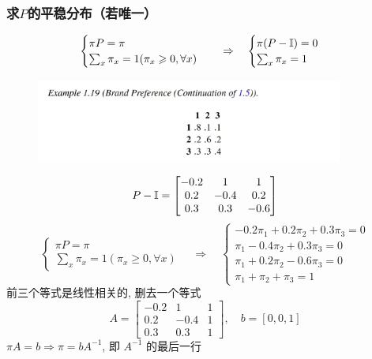 \subsubsection{求$P$的平稳分布（若唯一）}
\[
\begin{cases}
    \pi P=\pi\\
    \sum_{x}\pi_x=1(\pi_x\geqslant 0,\forall x)
\end{cases}\quad \Rightarrow \quad
\begin{cases}
    \pi(P-\mathbb I)=0\\
    \sum_x\pi_x=1
\end{cases}
\]
\begin{example}[Durrett, 1.19]
    \begin{figure}[H]
        \centering
        \includegraphics[width=0.9\textwidth]{figures/1_19.png}
    \end{figure}
\end{example}
\[
P-\mathbb I=\begin{bmatrix}
    -0.2 & 1 & 1\\
    0.2 & -0.4 & 0.2\\
    0.3 & 0.3 & -0.6
\end{bmatrix}
\]
\[
\begin{cases}
    \pi P=\pi\\
    \sum_{x}\pi_x=1(\pi_x\geq 0,\forall x)
\end{cases}\quad \Rightarrow \quad
\begin{cases}
    -0.2\pi_1+0.2\pi_2+0.3\pi_3=0\\
    \pi_1-0.4\pi_2+0.3\pi_3=0\\
    \pi_1+0.2\pi_2-0.6\pi_3=0\\
    \pi_1+\pi_2+\pi_3=1
\end{cases}
\]
前三个等式是线性相关的, 删去一个等式
\[
A=\begin{bmatrix}
    -0.2 & 1 & 1\\
    0.2 & -0.4 & 1\\
    0.3 & 0.3 & 1
\end{bmatrix},\quad b=[0,0,1]
\]
$\pi A=b\Rightarrow \pi=bA^{-1}$, 即 $A^{-1}$ 的最后一行

\newpage